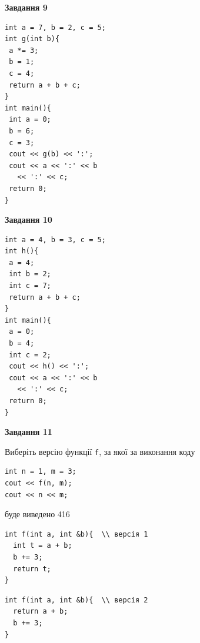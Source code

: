 \documentclass[12pt, ukrainian]{article}
\def\code#1{\Verb!#1!}
\begin{document}
{\begin {large}
\begin{minipage}[t]{11.0cm}
\end{minipage}


\begin{minipage}[t]{7.0cm}

\begin{center}
\textbf{Завдання 9}
\end{center}
\vspace{-8mm}

\begin{verbatim}
int a = 7, b = 2, c = 5;
int g(int b){
 a *= 3;
 b = 1;
 c = 4;
 return a + b + c;
}
int main(){
 int a = 0;
 b = 6;
 c = 3;
 cout << g(b) << ':';
 cout << a << ':' << b 
   << ':' << c;
 return 0;
}
\end{verbatim}



\begin{center}
\textbf{Завдання 10}
\end{center}
\vspace{-8mm}

\begin{verbatim}
int a = 4, b = 3, c = 5;
int h(){
 a = 4;
 int b = 2;
 int c = 7;
 return a + b + c;
}
int main(){
 a = 0;
 b = 4;
 int c = 2;
 cout << h() << ':';
 cout << a << ':' << b 
   << ':' << c;
 return 0;
}
\end{verbatim}

\end{minipage}
\vline \hspace{1mm}
\begin{minipage}[t]{11.0cm}

\begin{center}
\textbf{Завдання 11}
\end{center}
Виберіть версію функції \code{f}, за якої за виконання коду
\begin{verbatim}
int n = 1, m = 3;
cout << f(n, m);
cout << n << m;
\end{verbatim}

буде виведено 416

\begin{verbatim}
int f(int a, int &b){  \\ версія 1
  int t = a + b;
  b += 3;
  return t;
}
\end{verbatim}

\vspace{-8mm}\begin{verbatim}
int f(int a, int &b){  \\ версія 2
  return a + b;
  b += 3;
}
\end{verbatim}


\end{minipage}
\end{large}}
\end{document}
